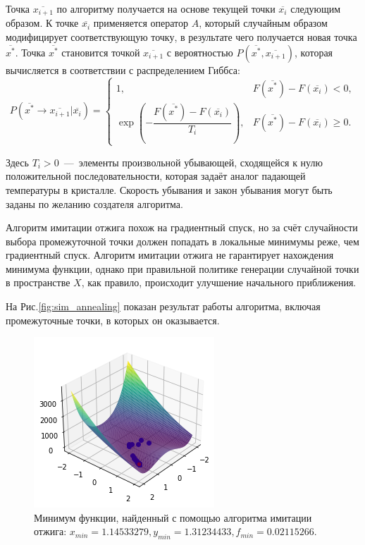 Точка \( \overline{x_{i+1}} \) по алгоритму получается на основе текущей 
 точки \( \overline{x_{i}} \) следующим образом. К точке \( \overline{x_i}
 \) применяется оператор \( A \), который случайным образом модифицирует 
 соответствующую точку, в результате чего получается новая точка 
 \( \overline{x^*} \). Точка \( \overline{x^*} \) становится точкой 
 \( \overline{x_{i+1}} \) с вероятностью \( P \left( \overline{x^*}, 
 \overline{x_{i+1}} \right) \), которая вычисляется в соответствии с 
 распределением Гиббса:
\[
 P \left( \overline{x^*} \to \overline{x_{i+1}} | \overline{x_{i}} \right) 
 = \begin{cases} 
    1, & F( \overline{x^{*}} ) -F( \overline{x_{i}}) < 0,\\
    \exp \left( -\dfrac{F(\overline{x^{*}}) - F(\overline{x_{i}})}{T_i}
    \right), & F(\overline{x^{*}}) - F(\overline{x_{i}}) \geq 0.
 \end{cases}
\]

Здесь \( T_i>0 \)~---~элементы произвольной убывающей, сходящейся к нулю
 положительной последовательности, которая задаёт аналог падающей 
 температуры в кристалле. Скорость убывания и закон убывания могут быть 
 заданы по желанию создателя алгоритма.

Алгоритм имитации отжига похож на градиентный спуск, но за счёт случайности
 выбора промежуточной точки должен попадать в локальные минимумы реже, чем 
 градиентный спуск. Алгоритм имитации отжига не гарантирует нахождения 
 минимума функции, однако при правильной политике генерации случайной 
 точки в пространстве \( X \), как правило, происходит улучшение начального 
 приближения.

На Рис.\eqref{fig:sim_annealing} показан результат работы алгоритма, 
 включая промежуточные точки, в которых он оказывается.

\begin{figure}[ht]
	\centering
	\includegraphics[width = 0.5\linewidth]{"./resources/sim_annealing.png"}
	\caption{Минимум функции, найденный с помощью алгоритма имитации отжига:
     \( x_{min} = 1.14533279, y_{min} = 1.31234433, f_{min} = 0.02115266.\)}
    \label{fig:sim_annealing}
\end{figure}

